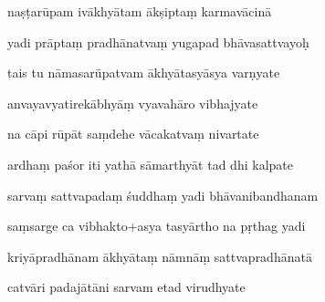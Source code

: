 \documentclass[article,12pt,a4paper]{memoir}%
\newcounter{parCount}
\begin{document}
	  
	  \pstart {} naṣṭarūpam ivākhyātam ākṣiptaṃ karmavācinā 
	{}
	\pend%
      

	  
	  \pstart \leavevmode%
	yadi prāptaṃ pradhānatvaṃ yugapad bhāvasattvayoḥ 
	{}
	\pend%
      

	  
	  \pstart {} tais tu nāmasarūpatvam ākhyātasyāsya varṇyate 
	{}
	\pend%
      

	  
	  \pstart \leavevmode%
	anvayavyatirekābhyāṃ vyavahāro vibhajyate 
	{}
	\pend%
      

	  
	  \pstart {} na cāpi rūpāt saṃdehe vācakatvaṃ nivartate 
	{}
	\pend%
      

	  
	  \pstart \leavevmode%
	ardhaṃ paśor iti yathā sāmarthyāt tad dhi kalpate 
	{}
	\pend%
      

	  
	  \pstart {} sarvaṃ sattvapadaṃ śuddhaṃ yadi bhāvanibandhanam 
	{}
	\pend%
      

	  
	  \pstart \leavevmode%
	saṃsarge ca vibhakto+asya tasyārtho na pṛthag yadi 
	{}
	\pend%
      

	  
	  \pstart {} kriyāpradhānam ākhyātaṃ nāmnāṃ sattvapradhānatā 
	{}
	\pend%
      

	  
	  \pstart \leavevmode%
	catvāri padajātāni sarvam etad virudhyate 
	{}
	\pend%
      
\end{document}
